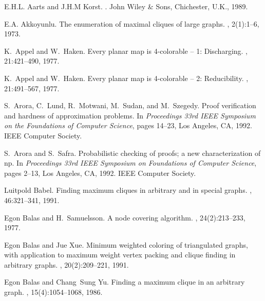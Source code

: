 %

%
%

\begin{thebibliography}{10}

E.H.L. Aarts and J.H.M Korst.
.
\newblock John Wiley \& Sons, Chichester, U.K., 1989.

E.A. Akkoyunlu.
\newblock The enumeration of maximal cliques of large graphs.
, 2(1):1--6, 1973.

K.~Appel and W.~Haken.
\newblock Every planar map is 4-colorable -- 1: Discharging.
, 21:421--490, 1977.

K.~Appel and W.~Haken.
\newblock Every planar map is 4-colorable -- 2: Reducibility.
, 21:491--567, 1977.

S.~Arora, C.~Lund, R.~Motwani, M.~Sudan, and M.~Szegedy.
\newblock Proof verification and hardness of approximation problems.
\newblock In {\em Proceedings 33rd {IEEE} {S}ymposium on the {F}oundations of
  {C}omputer {S}cience}, pages 14--23, Los Angeles, CA, 1992. IEEE Computer
  Society.

S.~Arora and S.~Safra.
\newblock Probabilistic checking of proofs; a new characterization of np.
\newblock In {\em Proceedings 33rd {IEEE} {S}ymposium on {F}oundations of
  {C}omputer {S}cience}, pages 2--13, Los Angeles, CA, 1992. IEEE Computer
  Society.

Luitpold Babel.
\newblock Finding maximum cliques in arbitrary and in special graphs.
, 46:321--341, 1991.

Egon Balas and H.~Samuelsson.
\newblock A node covering algorithm.
, 24(2):213--233, 1977.

Egon Balas and Jue Xue.
\newblock Minimum weighted coloring of triangulated graphs, with application to
  maximum weight vertex packing and clique finding in arbitrary graphs.
, 20(2):209--221, 1991.

Egon Balas and Chang~Sung Yu.
\newblock Finding a maximum clique in an arbitrary graph.
, 15(4):1054--1068, 1986.


\end{thebibliography}
